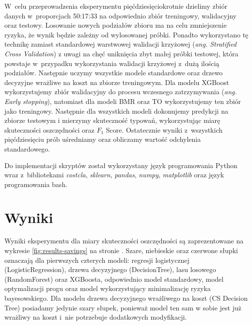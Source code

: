 \documentclass[inzynierska]{pwr_wmat_praca_dyplomowa}
\theoremstyle{plain}
\numberwithin{theorem}{chapter}
\theoremstyle{definition}
\numberwithin{theorem}{chapter}
\begin{document}
W~celu przeprowadzenia eksperymentu pięćdziesięciokrotnie dzielimy zbiór danych w~proporcjach 50:17:33 na odpowiednio zbiór treningowy, walidacyjny oraz testowy. Losowanie nowych podziałów zbioru ma na celu zmniejszenie ryzyka, że wynik będzie zależny od wylosowanej próbki. Ponadto wykorzystano tę technikę zamiast standardowej warstwowej walidacji krzyżowej (\textit{ang. Stratified Cross Validation}) z uwagi na chęć uniknięcia zbyt małej próbki testowej, która powstaje w~przypadku wykorzystania walidacji krzyżowej z~dużą ilością podziałów. Następnie uczymy wszystkie modele standardowe oraz drzewo decyzyjne wrażliwe na koszt na zbiorze treningowym. Dla modelu XGBoost wykorzystujemy zbiór walidacyjny do procesu wczesnego zatrzymywania (\textit{ang. Early stopping}), natomiast dla modeli BMR oraz TO wykorzystujemy ten zbiór jako treningowy. Następnie dla wszystkich modeli dokonujemy predykcji na zbiorze testowym i mierzymy skuteczność typowań, wykorzystując miarę skuteczności oszczędności oraz $F_1$ Score. Ostatecznie wyniki z~wszystkich pięćdziesięciu prób uśredniamy oraz obliczamy wartość odchylenia standardowego.

Do implementacji skryptów został wykorzystany język programowania Python wraz z~bibliotekami \textit{costcla}, \textit{sklearn}, \textit{pandas}, \textit{numpy}, \textit{matplotlib} oraz język programowania bash.

\section{Wyniki}

Wyniki eksperymentu dla miary skuteczności oszczędności są zaprezentowane na wykresie \ref{fig:results-savings} na stronie \pageref{fig:results-savings}. Szare, niebieskie oraz czerwone słupki oznaczają dla pierwszych czterych modeli: regresji logistycznej (LogisticRegression), drzewa decyzyjnego (DecisionTree), lasu losowego (RandomForest) oraz XGBoosta, odpowiednio model standardowy, model optymalizacji progu oraz model wykorzystujący minimalizację ryzyka bayesowskiego. Dla modelu drzewa decyzyjnego wrażliwego na koszt (CS Decision Tree) posiadamy jedynie szary słupek, ponieważ model ten sam w sobie jest już wrażliwy na koszt i~nie potrzebuje dodatkowych modyfikacji. 
\end{document}
